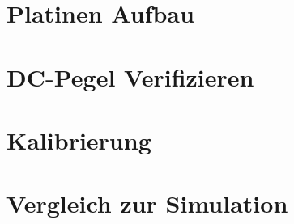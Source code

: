 
\section{Platinen Aufbau}
\section{DC-Pegel Verifizieren}
\section{Kalibrierung}
\section{Vergleich zur Simulation}
\clearpage